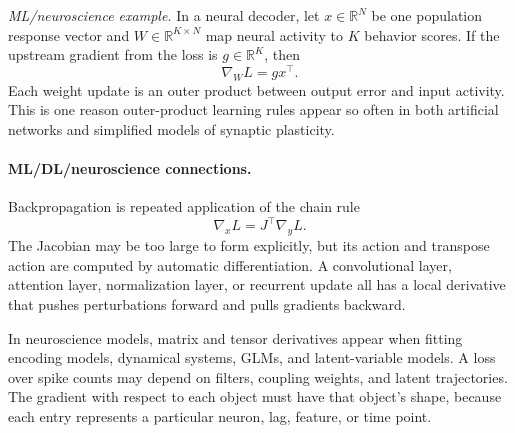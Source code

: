 \emph{ML/neuroscience example.} In a neural decoder, let \(x\in\mathbb{R}^N\) be one population response vector and \(W\in\mathbb{R}^{K\times N}\) map neural activity to \(K\) behavior scores. If the upstream gradient from the loss is \(g\in\mathbb{R}^K\), then
\[
\nabla_W L=gx^\top.
\]
Each weight update is an outer product between output error and input activity. This is one reason outer-product learning rules appear so often in both artificial networks and simplified models of synaptic plasticity.

\paragraph{ML/DL/neuroscience connections.}
Backpropagation is repeated application of the chain rule
\[
\nabla_x L=J^\top\nabla_y L.
\]
The Jacobian may be too large to form explicitly, but its action and transpose action are computed by automatic differentiation. A convolutional layer, attention layer, normalization layer, or recurrent update all has a local derivative that pushes perturbations forward and pulls gradients backward.

In neuroscience models, matrix and tensor derivatives appear when fitting encoding models, dynamical systems, GLMs, and latent-variable models. A loss over spike counts may depend on filters, coupling weights, and latent trajectories. The gradient with respect to each object must have that object's shape, because each entry represents a particular neuron, lag, feature, or time point.

